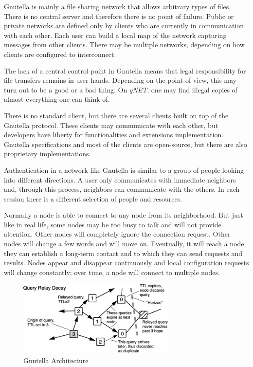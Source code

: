 Gnutella is mainly a file sharing network that allows arbitrary types of
files. There is no central server and therefore there is no point of failure.
Public or private networks are defined only by clients who are currently in
communication with each other. Each user can build a local map of the network
capturing messages from other clients. There may be multiple networks,
depending on how clients are configured to interconnect.

The lack of a central control point in Gnutella means that legal
responsibility for file transfers remains in user hands. Depending on the
point of view, this may turn out to be a good or a bad thing. On
\textit{gNET}, one may find illegal copies of almost everything one can think
of.

There is no standard client, but there are several clients built on top of the
Gnutella protocol. These clients may communicate with each other, but
developers have liberty for functionalities and extensions implementation.
Gnutella specifications and most of the clients are open-source, but there are
also proprietary implementations.

Authentication in a network like Gnutella is similar to a group of people
looking into different directions. A user only communicates with immediate
neighbors and, through this process, neighbors can communicate with the others.
In each session there is a different selection of people and resources.

Normally a node is able to connect to any node from its neighborhood. But just
like in real life, some nodes may be too busy to talk and will not provide
attention. Other nodes will completely ignore the connection request. Other
nodes will change a few words and will move on. Eventually, it will reach a
node they can establish a long-term contact and to which they can send
requests and results. Nodes appear and disappear continuously and local
configuration requests will change constantly; over time, a node will connect
to multiple nodes.

\begin{figure}
  \centering
  \includegraphics[width=0.7\textwidth]{src/img/p2p-systems/gnutella}
  \caption{Gnutella Architecture}
  \label{fig:p2p-systems:gnutella}
\end{figure}

